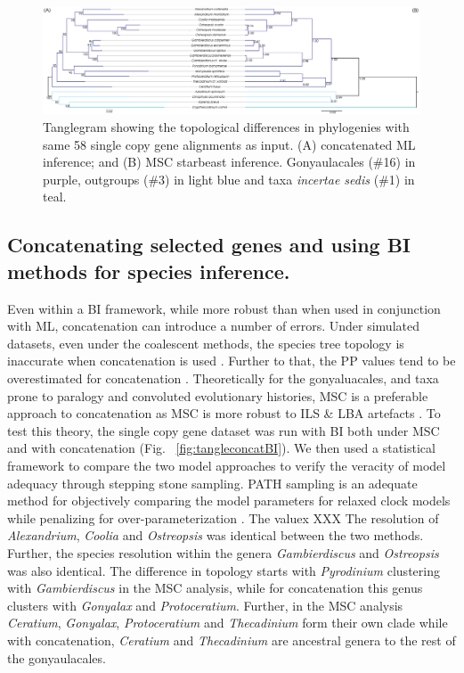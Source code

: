 \documentclass[12pt]{article}
\begin{document}
\begin{figure} 
\includegraphics[scale=.2]{figures/MSC-BI_vs_singlecopy-concat-ML.png} 
\caption{Tanglegram showing the topological differences in phylogenies with same 58 single copy gene alignments as input. (A) concatenated ML inference; and (B) MSC starbeast inference. Gonyaulacales (\#16) in purple, outgroups (\#3) in light blue and taxa \textit{incertae sedis} (\#1) in teal.} 
\label{fig:tangleconcatML}
\end{figure} 
\FloatBarrier

\subsection*{Concatenating selected genes and using BI methods for species inference.}
\FloatBarrier
Even within a BI framework, while more robust than when used in conjunction with ML, concatenation can introduce a number of errors. 
Under simulated datasets, even under the coalescent methods, the species tree topology is inaccurate when concatenation is used \cite{kubatko2007inconsistency}. 
Further to that, the PP values tend to be overestimated for concatenation \cite{suzuki2002overcredibility}. 
Theoretically for the gonyaluacales, and taxa prone to paralogy and convoluted evolutionary histories, MSC is a preferable approach to concatenation as MSC is more robust to ILS \& LBA artefacts \cite{liu2014coalescent}. 
To test this theory, the single copy gene dataset was run with BI both under MSC and with concatenation (Fig. ~\ref{fig:tangleconcatBI}). 
We then used a statistical framework to compare the two model approaches to verify the veracity of model adequacy through stepping stone sampling. 
PATH sampling is an adequate method for objectively comparing the model parameters for relaxed clock models while penalizing for over-parameterization \cite{baele2012accurate}. %
The valuex XXX %
The resolution of \textit{Alexandrium}, \textit{Coolia} and \textit{Ostreopsis} was identical between the two methods. 
Further, the species resolution within the genera \textit{Gambierdiscus} and \textit{Ostreopsis} was also identical. 
The difference in topology starts with \textit{Pyrodinium} clustering with \textit{Gambierdiscus} in the MSC analysis, while for concatenation this genus clusters with \textit{Gonyalax} and \textit{Protoceratium}. 
Further, in the MSC analysis \textit{Ceratium}, \textit{Gonyalax}, \textit{Protoceratium} and \textit{Thecadinium} form their own clade while with concatenation, \textit{Ceratium} and \textit{Thecadinium} are ancestral genera to the rest of the gonyaulacales. 
\end{document}
